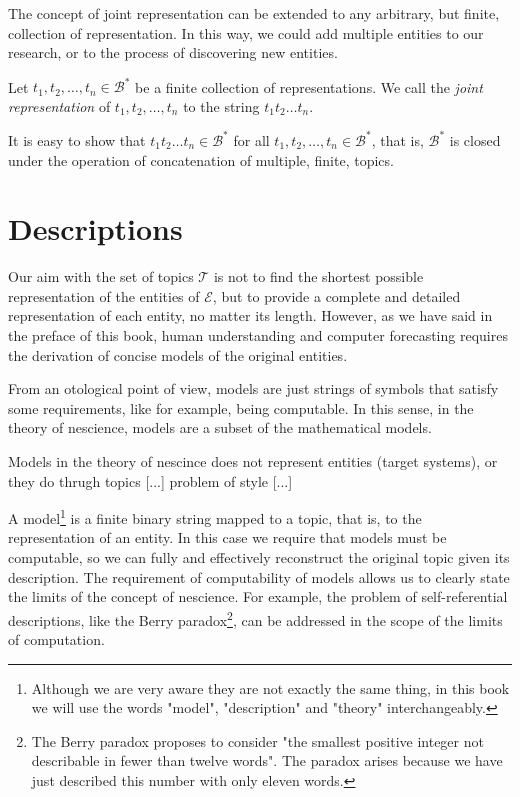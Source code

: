 The concept of joint representation can be extended to any arbitrary, but finite, collection of representation. In this way, we could add multiple entities to our research, or to the process of discovering new entities.

\begin{definition}
Let $t_1, t_2, \ldots, t_n \in \mathcal{B}^\ast$ be a finite collection of representations. We call the \emph{joint representation} of $t_1, t_2, \ldots, t_n$ to the string $t_1 t_2 \ldots t_n$.
\end{definition}

It is easy to show that $t_1 t_2 \ldots t_n \in \mathcal{B}^\ast$ for all $t_1, t_2, \ldots, t_n \in \mathcal{B}^\ast$, that is, $\mathcal{B}^\ast$ is closed under the operation of concatenation of multiple, finite, topics.

%
%

\section{Descriptions}
\label{sec:descriptions_models}

Our aim with the set of topics $\mathcal{T}$ is not to find the shortest possible representation of the entities of $\mathcal{E}$, but to provide a complete and detailed representation of each entity, no matter its length. However, as we have said in the preface of this book, human understanding and computer forecasting requires the derivation of concise models of the original entities.

{\color{red} From an otological point of view, models are just strings of symbols that satisfy some requirements, like for example, being computable. In this sense, in the theory of nescience, models are a subset of the mathematical models.}

{\color{red} Models in the theory of nescince does not represent entities (target systems), or they do thrugh topics [...] problem of style [...] }

A model\footnote{Although we are very aware they are not exactly the same thing, in this book we will use the words "model", "description" and "theory" interchangeably.} is a finite binary string mapped to a topic, that is, to the representation of an entity. In this case we require that models must be computable, so we can fully and effectively reconstruct the original topic given its description. The requirement of computability of models allows us to clearly state the limits of the concept of nescience. For example, the problem of self-referential descriptions, like the Berry paradox\footnote{The Berry paradox proposes to consider "the smallest positive integer not describable in fewer than twelve words". The paradox arises because we have just described this number with only eleven words.}, can be addressed in the scope of the limits of computation.

